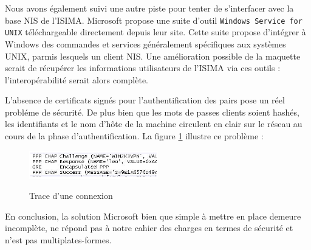 Nous avons également suivi une autre piste pour tenter de s'interfacer avec la base NIS de l'ISIMA. Microsoft propose une suite d'outil \verb|Windows Service for UNIX| téléchargeable directement depuis leur site. Cette suite propose d'intégrer à Windows des commandes et services généralement spécifiques aux systèmes UNIX, parmis lesquels un client NIS. Une amélioration possible de la maquette serait de récupérer les informations utilisateurs de l'ISIMA via ces outils : l'interopérabilité serait alors complète.

L'absence de certificats signés pour l'authentification des pairs pose un réel probléme de sécurité. De plus bien que les mots de passes clients soient hashés, les identifiants et le nom d'hôte de la machine circulent en clair sur le réseau au cours de la phase d'authentification. La figure \ref{VPN_CONNEXION} illustre ce problème :

\begin{figure}[H]
	\begin{center}
		\includegraphics[width=0.5\textwidth]{partie_2/screen_windows/connexion.png}\\
	\end{center}
	\caption{Trace d'une connexion}
	\label{VPN_CONNEXION}
\end{figure}




En conclusion, la solution Microsoft bien que simple à mettre en place demeure incomplète, ne répond pas à notre cahier des charges en termes de sécurité et n'est pas multiplates-formes.
